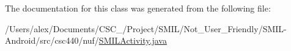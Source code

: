 The documentation for this class was generated from the following file\-:\begin{DoxyCompactItemize}
\item 
/\-Users/alex/\-Documents/\-C\-S\-C\-\_/\-Project/\-S\-M\-I\-L/\-Not\-\_\-\-User\-\_\-\-Friendly/\-S\-M\-I\-L-\/\-Android/src/csc440/nuf/\hyperlink{_s_m_i_l_activity_8java}{S\-M\-I\-L\-Activity.\-java}\end{DoxyCompactItemize}
